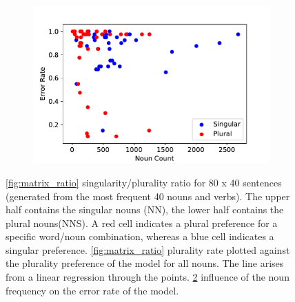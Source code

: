 \begin{figure}
\begin{subfigure}[b]{0.4\textwidth}
        \includegraphics[width=\textwidth]{noun_freq_error_rate.pdf}
        \label{fig:noun_freq_error}
    \end{subfigure}
    \caption{\ref{fig:matrix_ratio} singularity/plurality ratio for 80 x 40 sentences (generated from the most frequent 40 nouns and verbs). The upper half contains the singular nouns (NN), the lower half contains the plural nouns(NNS). A red cell indicates a plural preference for a specific word/noun combination, whereas a blue cell indicates a singular preference. \ref{fig:matrix_ratio} plurality rate plotted against the plurality preference of the model for all nouns. The line arises from a linear regression through the points. \ref{fig:noun_freq_error} influence of the noun frequency on the error rate of the model.}
\end{figure}

